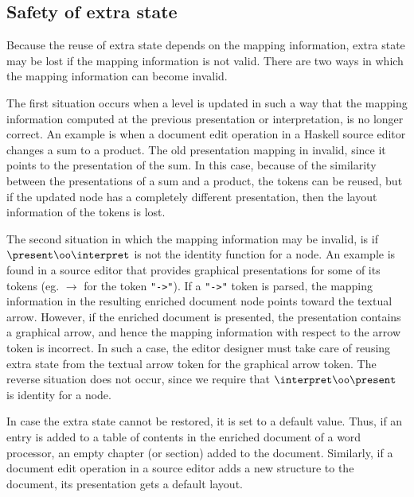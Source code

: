 %																
\subsection{Safety of extra state}

Because the reuse of extra state depends on the mapping information, extra state may be lost if the mapping information is not valid. There are two ways in which the mapping information can become invalid.  

The first situation occurs when a level is updated in such a way that the mapping information computed at the previous presentation or interpretation, is no longer correct. An example is when a document edit operation in a Haskell source editor changes a sum to a product. The old presentation mapping in invalid, since it points to the presentation of the sum. In this case, because of the similarity between the presentations of a sum and a product, the tokens can be reused, but if the updated node has a completely different presentation, then the layout information of the tokens is lost. 

The second situation in which the mapping information may be invalid, is if 
$\present \oo \interpret$ is not the identity function for a node.  An example is found in a source editor that provides graphical presentations for some of its tokens (eg. $\rightarrow$ for the token \verb|"->"|). If a \verb|"->"| token is parsed, the mapping information in the resulting enriched document node points toward the textual arrow. However, if the enriched document is presented, the presentation contains a graphical arrow, and hence the mapping information with respect to the arrow token is incorrect. In such a case, the editor designer must take care of reusing extra state from the textual arrow token for the graphical arrow token. The reverse situation does not occur, since we require that $\interpret \oo \present$ is identity for a node. 

In case the extra state cannot be restored, it is set to a default value. Thus, if an entry is added to a table of contents in the enriched document of a word processor, an empty chapter (or section) added to the document. Similarly, if a document edit operation in a source editor adds a new structure to the document, its presentation gets a default layout.

